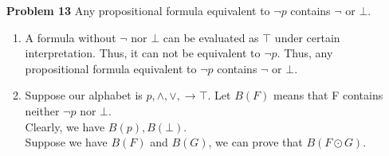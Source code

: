 \documentclass[12pt]{article}
\begin{document}
\begin{enumerate}
\begin{enumerate} [(i)]
          \item $\rightarrow $ and $\bot$ 
            \begin{itemize}
                \item There is no connective in atoms. Thus every atom has property $P$. 
                \item $\top \sim p \rightarrow p \: (\bot \rightarrow p) $; $\bot$ is trivial. Thus $\top$ and $\bot$ has property $P$. 
                \item By induction hypothesis, there exist $F' \sim F$, that contains no connective other than $\rightarrow $  $\bot$.  Clearly, $\neg F \sim \neg F' \sim F' \rightarrow \bot $.  So if a formula $F$ has property P then so does $\neg F$.
                \item $F \wedge G \sim F' \wedge G' \sim \neg ( F' \rightarrow \neg G') \sim [F' \rightarrow (G' \rightarrow \bot)] \rightarrow \bot ] $; \\
                 $F \vee G \sim F' \vee G' \sim \neg F' \rightarrow G' \sim (F' \rightarrow \bot) \rightarrow G'$;  \\
                 $ F \rightarrow G \sim F' \rightarrow G' $\\
                 Thus, for any binary connective $\odot$, if formulas $F$ and $G$ has property $P$, then so does $(F \odot G)$. 
            \end{itemize}
       Then we can conclude that property $P$ holds for all formulas.    
    \end{enumerate}

\item[\textbf{Problem 13}] Any propositional formula equivalent to $\neg p$ contains $\neg$ or $\bot$.   \begin{enumerate}[Prove 1:]
\item A formula without $\neg$ nor $\bot$ can be evaluated as $\top$ under certain interpretation. Thus, it can not be equivalent to $\neg p$. Thus, any propositional formula equivalent to $\neg p$ contains $\neg$ or $\bot$.
\item Suppose our alphabet is $p, \wedge, \vee, \rightarrow \top$. Let $B(F)$ means that F contains neither $\neg p$ nor $ \bot$.  \\
Clearly, we have $B(p), B(\bot)$. \\
Suppose we have $B(F)$ and $B(G)$, we can prove that $B( F \odot G)$. 
\end{enumerate}


\end{enumerate}
\end{document}
